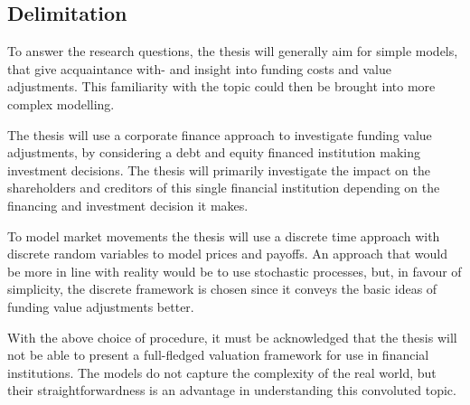 \documentclass[main.tex]{subfiles}
\begin{document}
    \subsection{Delimitation}

    To answer the research questions, the thesis will generally aim for simple models,
    that give acquaintance with- and insight into funding costs and value adjustments.
    This familiarity with the topic could then be brought into more complex modelling.

    The thesis will use a corporate finance approach to investigate funding value adjustments,
    by considering a debt and equity financed institution making investment decisions.
    The thesis will primarily investigate the impact on the shareholders and creditors 
    of this single financial institution depending on the financing and investment decision it makes.

    To model market movements the thesis will use a discrete time approach 
    with discrete random variables to model prices and payoffs.
    An approach that would be more in line with reality would be to use stochastic processes,
    but, in favour of simplicity, the discrete framework is chosen 
    since it conveys the basic ideas of funding value adjustments better.

    With the above choice of procedure, it must be acknowledged that the thesis will not be able to
    present a full-fledged valuation framework for use in financial institutions.
    The models do not capture the complexity of the real world,
    but their straightforwardness is an advantage in understanding this convoluted topic.
\end{document}
